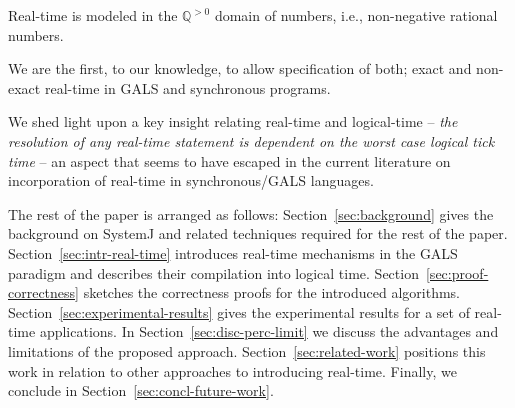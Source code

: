 \begin{enumerate*}
\item Real-time is modeled in the $\mathbb{Q}^{>0}$ domain of numbers,
 i.e., non-negative rational numbers.
\item We are the first, to our knowledge, to allow specification of
  both; exact and non-exact real-time in GALS and synchronous programs.
\item We shed light upon a key insight relating real-time and
  logical-time -- \textit{the resolution of any real-time statement is
    dependent on the worst case logical tick time} -- an aspect that
  seems to have escaped in the current literature on incorporation of
  real-time in synchronous/GALS languages.
\end{enumerate*}

The rest of the paper is arranged as follows:
Section~\ref{sec:background} gives the background on SystemJ and related
techniques required for the rest of the
paper. Section~\ref{sec:intr-real-time} introduces real-time mechanisms
in the GALS paradigm and describes their compilation into logical
time. Section~\ref{sec:proof-correctness} sketches the correctness
proofs for the introduced
algorithms. Section~\ref{sec:experimental-results} gives the
experimental results for a set of real-time applications. In
Section~\ref{sec:disc-perc-limit} we discuss the advantages and
limitations of the proposed approach. Section~\ref{sec:related-work}
positions this work in relation to other approaches to introducing
real-time. Finally, we conclude in Section~\ref{sec:concl-future-work}.


